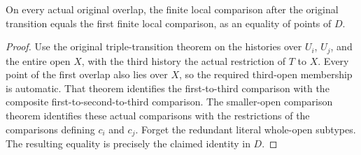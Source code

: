 \begin{lemma}
\label{hir:original-global-terminal-finite-local-compatibility}
\leanok
{}
On every actual original overlap, the finite local comparison after the
original transition equals the first finite local comparison, as an equality
of points of $D$.
\end{lemma}
\begin{proof}
Use the original triple-transition theorem on the histories over $U_i$,
$U_j$, and the entire open $X$, with the third history the actual restriction
of $T$ to $X$. Every point of the first overlap also lies over $X$, so the
required third-open membership is automatic. That theorem identifies the
first-to-third comparison with the composite first-to-second-to-third
comparison. The smaller-open comparison theorem identifies these actual
comparisons with the restrictions of the comparisons defining $c_i$ and
$c_j$. Forget the redundant literal whole-open subtypes. The resulting
equality is precisely the claimed identity in $D$.
\end{proof}


